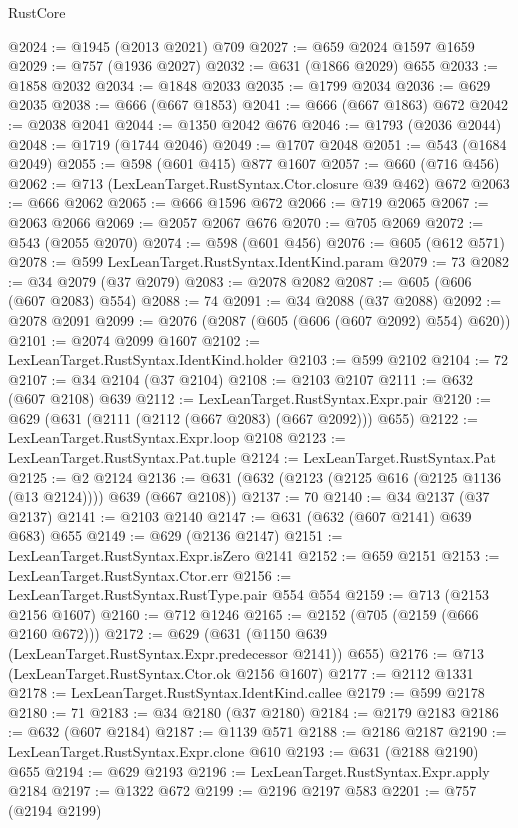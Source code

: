 \begin{lexlean}{RustCore}
\begin{coremodule}
@2024 := @1945 (@2013 @2021) @709
@2027 := @659 @2024 @1597 @1659
@2029 := @757 (@1936 @2027)
@2032 := @631 (@1866 @2029) @655
@2033 := @1858 @2032
@2034 := @1848 @2033
@2035 := @1799 @2034
@2036 := @629 @2035
@2038 := @666 (@667 @1853)
@2041 := @666 (@667 @1863) @672
@2042 := @2038 @2041
@2044 := @1350 @2042 @676
@2046 := @1793 (@2036 @2044)
@2048 := @1719 (@1744 @2046)
@2049 := @1707 @2048
@2051 := @543 (@1684 @2049)
@2055 := @598 (@601 @415) @877 @1607
@2057 := @660 (@716 @456)
@2062 := @713 (LexLeanTarget.RustSyntax.Ctor.closure @39 @462) @672
@2063 := @666 @2062
@2065 := @666 @1596 @672
@2066 := @719 @2065
@2067 := @2063 @2066
@2069 := @2057 @2067 @676
@2070 := @705 @2069
@2072 := @543 (@2055 @2070)
@2074 := @598 (@601 @456)
@2076 := @605 (@612 @571)
@2078 := @599 LexLeanTarget.RustSyntax.IdentKind.param
@2079 := 73
@2082 := @34 @2079 (@37 @2079)
@2083 := @2078 @2082
@2087 := @605 (@606 (@607 @2083) @554)
@2088 := 74
@2091 := @34 @2088 (@37 @2088)
@2092 := @2078 @2091
@2099 := @2076 (@2087 (@605 (@606 (@607 @2092) @554) @620))
@2101 := @2074 @2099 @1607
@2102 := LexLeanTarget.RustSyntax.IdentKind.holder
@2103 := @599 @2102
@2104 := 72
@2107 := @34 @2104 (@37 @2104)
@2108 := @2103 @2107
@2111 := @632 (@607 @2108) @639
@2112 := LexLeanTarget.RustSyntax.Expr.pair
@2120 := @629 (@631 (@2111 (@2112 (@667 @2083) (@667 @2092))) @655)
@2122 := LexLeanTarget.RustSyntax.Expr.loop @2108
@2123 := LexLeanTarget.RustSyntax.Pat.tuple
@2124 := LexLeanTarget.RustSyntax.Pat
@2125 := @2 @2124
@2136 := @631 (@632 (@2123 (@2125 @616 (@2125 @1136 (@13 @2124)))) @639 (@667 @2108))
@2137 := 70
@2140 := @34 @2137 (@37 @2137)
@2141 := @2103 @2140
@2147 := @631 (@632 (@607 @2141) @639 @683) @655
@2149 := @629 (@2136 @2147)
@2151 := LexLeanTarget.RustSyntax.Expr.isZero @2141
@2152 := @659 @2151
@2153 := LexLeanTarget.RustSyntax.Ctor.err
@2156 := LexLeanTarget.RustSyntax.RustType.pair @554 @554
@2159 := @713 (@2153 @2156 @1607)
@2160 := @712 @1246
@2165 := @2152 (@705 (@2159 (@666 @2160 @672)))
@2172 := @629 (@631 (@1150 @639 (LexLeanTarget.RustSyntax.Expr.predecessor @2141)) @655)
@2176 := @713 (LexLeanTarget.RustSyntax.Ctor.ok @2156 @1607)
@2177 := @2112 @1331
@2178 := LexLeanTarget.RustSyntax.IdentKind.callee
@2179 := @599 @2178
@2180 := 71
@2183 := @34 @2180 (@37 @2180)
@2184 := @2179 @2183
@2186 := @632 (@607 @2184)
@2187 := @1139 @571
@2188 := @2186 @2187
@2190 := LexLeanTarget.RustSyntax.Expr.clone @610
@2193 := @631 (@2188 @2190) @655
@2194 := @629 @2193
@2196 := LexLeanTarget.RustSyntax.Expr.apply @2184
@2197 := @1322 @672
@2199 := @2196 @2197 @583
@2201 := @757 (@2194 @2199)

\end{coremodule}
\end{lexlean}
